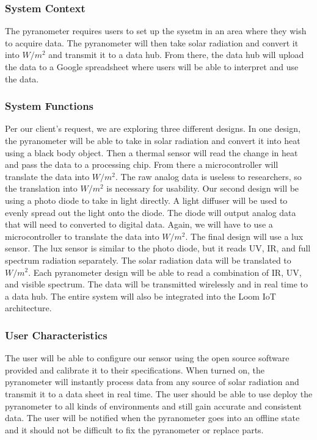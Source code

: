 \documentclass[10pt,draftclsnofoot,onecolumn,letterpaper]{article}
\begin{document}
\subsubsection{System Context}
The pyranometer requires users to set up the sysetm in an area where they wish to acquire data. The pyranometer will then take solar radiation and convert it into $W/m^2$ and transmit it to a data hub. From there, the data hub will upload the data to a Google spreadsheet where users will be able to interpret and use the data.

\subsubsection{System Functions}
Per our client's request, we are exploring three different designs. In one design, the pyranometer will be able to take in solar radiation and convert it into heat using a black body object. Then a thermal sensor will read the change in heat and pass the data to a processing chip. From there a microcontroller will translate the data into $W/m^2$. The raw analog data is useless to researchers, so the translation into $W/m^2$ is necessary for usability. Our second design will be using a photo diode to take in light directly. A light diffuser will be used to evenly spread out the light onto the diode. The diode will output analog data that will need to converted to digital data. Again, we will have to use a microcontroller to translate the data into $W/m^2$. The final design will use a lux sensor. The lux sensor is similar to the photo diode, but it reads UV, IR, and full spectrum radiation separately. The solar radiation data will be translated to $W/m^2$. Each pyranometer design will be able to read a combination of IR, UV, and visible spectrum. The data will be transmitted wirelessly and in real time to a data hub. The entire system will also be integrated into the Loom IoT architecture.

\subsubsection{User Characteristics}
The user will be able to configure our sensor using the open source software provided and calibrate it to their specifications. When turned on, the pyranometer will instantly process data from any source of solar radiation and transmit it to a data sheet in real time. The user should be able to use deploy the pyranometer to all kinds of environments and still gain accurate and consistent data. The user will be notified when the pyranometer goes into an offline state and it should not be difficult to fix the pyranometer or replace parts.
\end{document}
